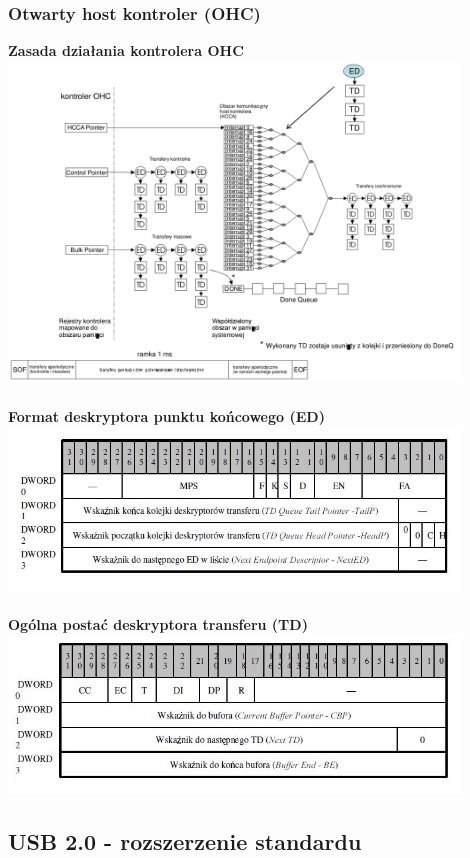 	\subsubsection{Otwarty host kontroler (OHC)}
	\textbf{Zasada działania kontrolera OHC}\\
	\includegraphics[width=12cm]{./wyklady/USB_49_1.pdf}\\\\
	\textbf{Format deskryptora punktu końcowego (ED)}\\
	\includegraphics[width=12cm]{./wyklady/USB_50_1.jpg}\\\\
	\textbf{Ogólna postać deskryptora transferu (TD)}\\
	\includegraphics[width=12cm]{./wyklady/USB_51_1.jpg}
	\newpage
\subsection{USB 2.0 - rozszerzenie standardu}
